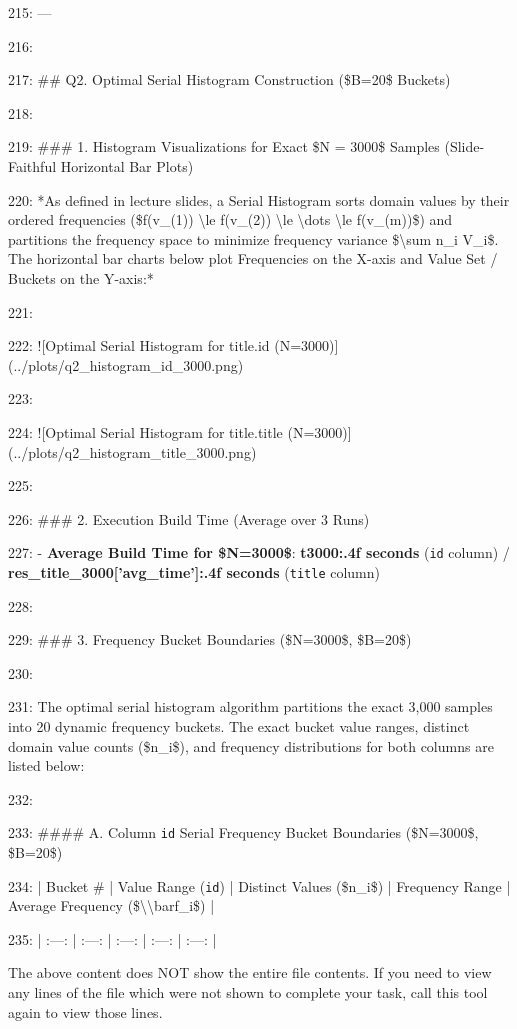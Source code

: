 \documentclass[11pt,a4paper]{article}
\begin{document}
215: ---

216:

217: \#\# Q2. Optimal Serial Histogram Construction (\$B=20\$ Buckets)

218:

219: \#\#\# 1. Histogram Visualizations for Exact \$N = 3000\$ Samples (Slide-Faithful Horizontal Bar Plots)

220: *As defined in lecture slides, a Serial Histogram sorts domain values by their ordered frequencies (\$f(v\_{{(1)}}) \textbackslash{}le f(v\_{{(2)}}) \textbackslash{}le \textbackslash{}dots \textbackslash{}le f(v\_{{(m)}})\$) and partitions the frequency space to minimize frequency variance \$\textbackslash{}sum n\_i V\_i\$. The horizontal bar charts below plot Frequencies on the X-axis and Value Set / Buckets on the Y-axis:*

221:

222: ![Optimal Serial Histogram for title.id (N=3000)](../plots/q2\_histogram\_id\_3000.png)

223:

224: ![Optimal Serial Histogram for title.title (N=3000)](../plots/q2\_histogram\_title\_3000.png)

225:

226: \#\#\# 2. Execution Build Time (Average over 3 Runs)

227: - \textbf{Average Build Time for \$N=3000\$}: \textbf{{t3000:.4f} seconds} (\texttt{id} column) / \textbf{{res\_title\_3000['avg\_time']:.4f} seconds} (\texttt{title} column)

228:

229: \#\#\# 3. Frequency Bucket Boundaries (\$N=3000\$, \$B=20\$)

230:

231: The optimal serial histogram algorithm partitions the exact 3,000 samples into 20 dynamic frequency buckets. The exact bucket value ranges, distinct domain value counts (\$n\_i\$), and frequency distributions for both columns are listed below:

232:

233: \#\#\#\# A. Column \texttt{id} Serial Frequency Bucket Boundaries (\$N=3000\$, \$B=20\$)

234: | Bucket \# | Value Range (\texttt{id}) | Distinct Values (\$n\_i\$) | Frequency Range | Average Frequency (\$\textbackslash{}\textbackslash{}bar{{f}}\_i\$) |

235: | :---: | :---: | :---: | :---: | :---: |

The above content does NOT show the entire file contents. If you need to view any lines of the file which were not shown to complete your task, call this tool again to view those lines.
\end{document}
